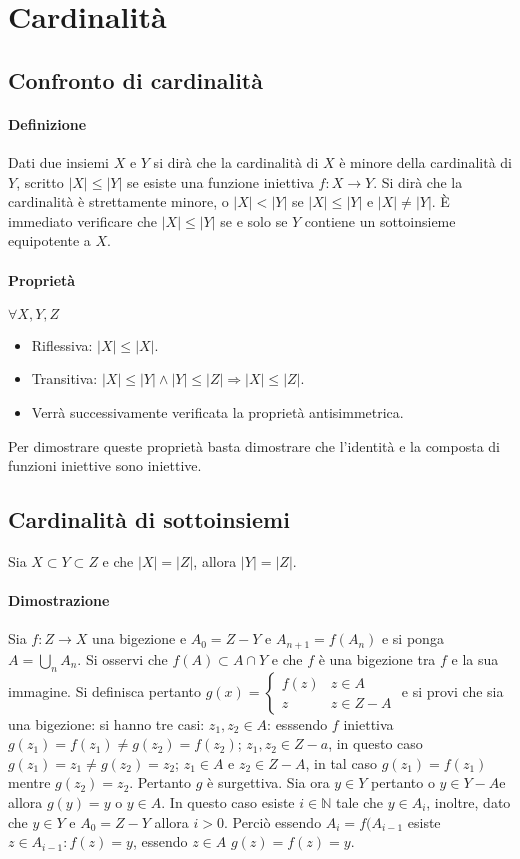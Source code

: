 \chapter{Cardinalit\`a}
\section{Confronto di cardinalit\`a}
\subsubsection{Definizione}
Dati due insiemi $X$ e $Y$ si dir\`a che la cardinalit\`a di $X$ \`e minore della cardinalit\`a di $Y$, scritto $|X|\le|Y|$ se esiste una funzione iniettiva $f:X\rightarrow Y$.
Si dir\`a che la cardinalit\`a \`e strettamente minore, o $|X|<|Y|$ se $|X|\le|Y|$ e $|X|\neq|Y|$. \`E immediato verificare che $|X|\le|Y|$ se e solo se $Y$ contiene un 
sottoinsieme equipotente a $X$.
\subsubsection{Propriet\`a}
$\forall X,Y,Z$
\begin{itemize}
\item Riflessiva: $|X|\le|X|$.
\item Transitiva: $|X|\le|Y|\wedge|Y|\le|Z|\Rightarrow|X|\le|Z|$.
\item Verr\`a successivamente verificata la propriet\`a antisimmetrica.
\end{itemize}
Per dimostrare queste propriet\`a basta dimostrare che l'identit\`a e la composta di funzioni iniettive sono iniettive.
\section{Cardinalit\`a di sottoinsiemi}
Sia $X\subset Y\subset Z$ e che $|X|=|Z|$, allora $|Y|=|Z|$.
\subsubsection{Dimostrazione}
Sia $f:Z\rightarrow X$ una bigezione e $A_0=Z-Y$ e $A_{n+1}=f(A_n)$ e si ponga $A=\bigcup\limits_nA_n$. Si osservi che $f(A)\subset A\cap Y$ e che $f$ \`e una bigezione tra $f$ 
e la sua immagine. Si definisca pertanto $g(x)=\begin{cases}f(z)&z\in A\\z&z\in Z-A\end{cases}$ e si provi che sia una bigezione: si hanno tre casi: $z_1, z_2\in A$: esssendo 
$f$ iniettiva $g(z_1)=f(z_1)\neq g(z_2)=f(z_2)$; $z_1, z_2\in Z-a$, in questo caso $g(z_1)=z_1\neq g(z_2)=z_2$; $z_1\in A$ e $z_2\in Z-A$, in tal caso $g(z_1)=f(z_1)$ mentre
$g(z_2)=z_2$. Pertanto $g$ \`e surgettiva. Sia ora $y\in Y$ pertanto o $y\in Y-A$e  allora $g(y)=y$ o $y\in A$. In questo caso esiste $i\in\mathbb{N}$ tale che $y\in A_i$, 
inoltre, dato che $y\in Y$ e $A_0=Z-Y$ allora $i>0$. Perci\`o essendo $A_i=f(A_{i-1}$ esiste $z\in A_{i-1}: f(z)=y$, essendo $z\in A$ $g(z)=f(z)=y$.
